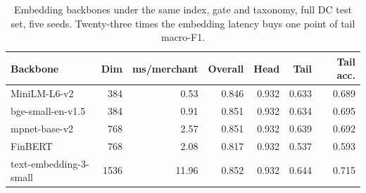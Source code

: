 \begin{table}[t]
\centering
\caption{Embedding backbones under the same index, gate and taxonomy, full DC test set, five seeds. Twenty-three times the embedding latency buys one point of tail macro-F1.}
\label{tab:backbones}
\begin{tabular}{lrrrrrr}
\toprule
Backbone & Dim & ms/merchant & Overall & Head & Tail & Tail acc.\\
\midrule
MiniLM-L6-v2 & 384 & 0.53 & 0.846 & 0.932 & 0.633 & 0.689 \\
bge-small-en-v1.5 & 384 & 0.91 & 0.851 & 0.932 & 0.634 & 0.695 \\
mpnet-base-v2 & 768 & 2.57 & 0.851 & 0.932 & 0.639 & 0.692 \\
FinBERT & 768 & 2.08 & 0.817 & 0.932 & 0.537 & 0.593 \\
text-embedding-3-small & 1536 & 11.96 & 0.852 & 0.932 & 0.644 & 0.715 \\
\bottomrule
\end{tabular}
\end{table}
